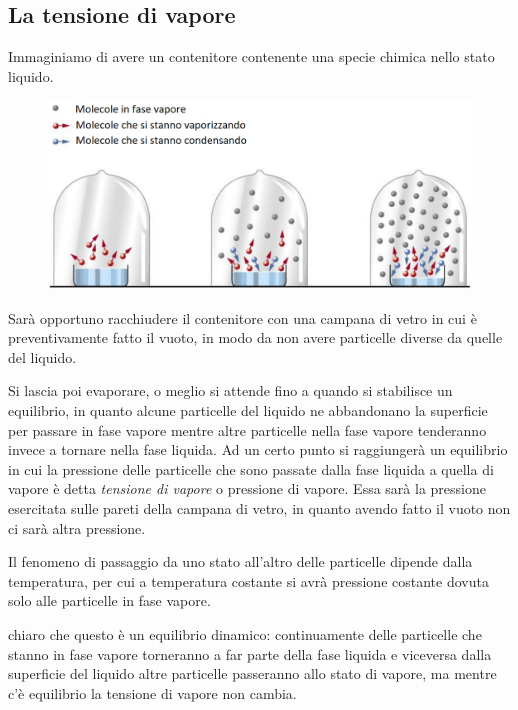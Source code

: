 \subsection{La tensione di vapore}
Immaginiamo di avere un contenitore contenente una specie chimica nello stato liquido.

\begin{figure}[htp]
    \centering
    \includegraphics[width=15cm]{immagini/campana_di_vetro}
\end{figure}

Sarà opportuno racchiudere il contenitore con una campana di vetro in cui è preventivamente fatto il vuoto, in modo da non avere particelle diverse da quelle del liquido.

Si lascia poi evaporare, o meglio si attende fino a quando si stabilisce un equilibrio, in quanto alcune particelle del liquido ne abbandonano la superficie per passare in fase vapore mentre altre particelle nella fase vapore tenderanno invece a tornare nella fase liquida. Ad un certo punto si raggiungerà un equilibrio in cui la pressione delle particelle che sono passate dalla fase liquida a quella di vapore è detta \textit{tensione di vapore} o pressione di vapore. Essa sarà la pressione esercitata sulle pareti della campana di vetro, in quanto avendo fatto il vuoto non ci sarà altra pressione.

Il fenomeno di passaggio da uno stato all'altro delle particelle dipende dalla temperatura, per cui a temperatura costante si avrà pressione costante dovuta solo alle particelle in fase vapore.

\vspace{0.2cm}\E chiaro che questo è un equilibrio dinamico: continuamente delle particelle che stanno in fase vapore torneranno a far parte della fase liquida e viceversa dalla superficie del liquido altre particelle passeranno allo stato di vapore, ma mentre c'è equilibrio la tensione di vapore non cambia.


